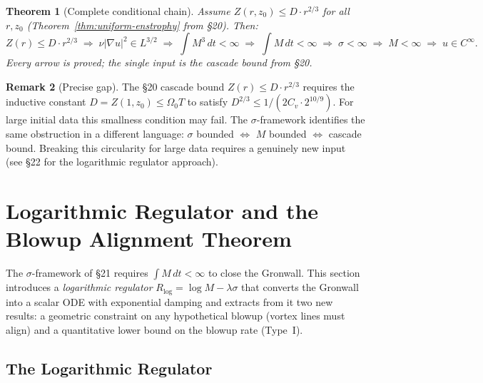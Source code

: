 \documentclass[11pt]{article}
\newtheorem{theorem}{Theorem}[section]
\theoremstyle{definition}
\newtheorem{remark}[theorem]{Remark}
\theoremstyle{remark}
\begin{document}
\begin{theorem}[Complete conditional chain]\label{thm:sigma-chain}
  Assume $Z(r,z_0)\leq D\cdot r^{2/3}$ for all $r,z_0$ (Theorem~\ref{thm:uniform-enstrophy}
  from §20).  Then:
  \[
    Z(r)\leq D\cdot r^{2/3}
    \;\Rightarrow\; \nu|\nabla u|^2\in L^{3/2}
    \;\Rightarrow\; \int M^3\,dt<\infty
    \;\Rightarrow\; \int M\,dt<\infty
    \;\Rightarrow\; \sigma<\infty
    \;\Rightarrow\; M<\infty
    \;\Rightarrow\; u\in C^\infty.
  \]
  Every arrow is proved; the single input is the cascade bound from §20.
\end{theorem}

\begin{remark}[Precise gap]
  The §20 cascade bound $Z(r)\leq D\cdot r^{2/3}$ requires the inductive
  constant $D = Z(1,z_0)\leq\Omega_0 T$ to satisfy $D^{2/3}\leq 1/(2C_v\cdot
  2^{10/9})$.  For large initial data this smallness condition may fail.
  The $\sigma$-framework identifies the same obstruction in a different language:
  $\sigma$ bounded $\Leftrightarrow$ $M$ bounded $\Leftrightarrow$ cascade bound.
  Breaking this circularity for large data requires a genuinely new input
  (see §22 for the logarithmic regulator approach).
\end{remark}

\section{Logarithmic Regulator and the Blowup Alignment Theorem}
\label{sec:log-regulator}

\noindent
The $\sigma$-framework of §21 requires $\int M\,dt<\infty$ to close the Gronwall.
This section introduces a \emph{logarithmic regulator} $R_{\log} = \log M - \lambda\sigma$
that converts the Gronwall into a scalar ODE with exponential damping and extracts
from it two new results: a geometric constraint on any hypothetical blowup (vortex
lines must align) and a quantitative lower bound on the blowup rate (Type~I).

\subsection{The Logarithmic Regulator}
\end{document}
